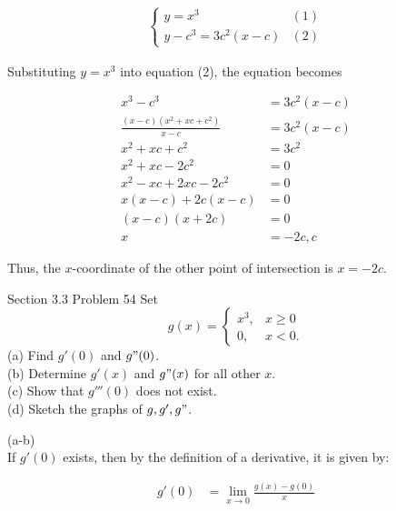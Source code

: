 \documentclass{article}
\begin{document}
    \begin{align*}
        \begin{cases}
            y = x^3     & (1)\\
            y - c^3 = 3c^2 (x-c) & (2)
        \end{cases}
    \end{align*}

    Substituting $y=x^3$ into equation (2), the equation becomes

    \begin{align*}
        x^3 - c^3   &= 3c^2 (x-c) \\
        \frac{(x-c)(x^2 + xc + c^2)}{x-c}   &= 3c^2 (x-c) \\
        x^2 + xc + c^2                      &= 3c^2 \\
        x^2 + xc -2c^2                      &= 0 \\
        x^2 - xc + 2xc -2c^2                &= 0 \\
        x(x-c) + 2c(x-c)                    &= 0 \\
        (x-c)(x+2c)                         &= 0 \\
        x                                   &= -2c, c
    \end{align*}

    Thus, the $x$-coordinate of the other point of intersection is $x=-2c$. \\



    \begin{tbhtheorem}{Section 3.3 Problem 54}
        Set
        \[
            g(x) =
            \begin{cases}
                x^3,    & x \geq 0 \\
                0,      & x < 0.
            \end{cases}
        \]
        (a) Find $g'(0)$ and $g"(0)$. \\
        (b) Determine $g'(x)$ and $g"(x)$ for all other $x$. \\
        (c) Show that $g'''(0)$ does not exist. \\
        (d) Sketch the graphs of $g, g', g"$.
    \end{tbhtheorem}


    (a-b) \\
    If $g'(0)$ exists, then by the definition of a derivative, it is given by:

    \begin{align*}
        g'(0)   &= \lim_{x\to 0} \frac{g(x) - g(0)}{x}
    \end{align*}
\end{document}

